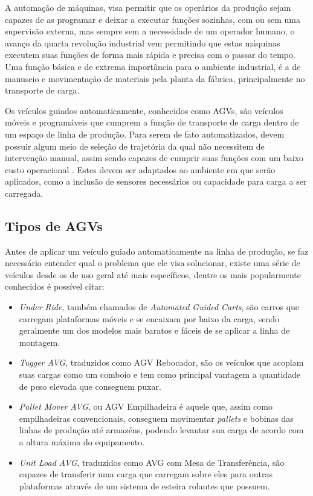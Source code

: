 A automação de máquinas, visa permitir que os operários da produção sejam
capazes de as programar e deixar a executar funções sozinhas, com ou sem uma
supervisão externa, mas sempre sem a necessidade de um operador humano, o
avanço da quarta revolução industrial vem permitindo que estas máquinas
executem suas funções de forma mais rápida e precisa com o passar do tempo. Uma
função básica e de extrema importância para o ambiente industrial, é a de
manuseio e movimentação de materiais pela planta da fábrica, principalmente no
transporte de carga. 


Os veículos guiados automaticamente, conhecidos como AGVs, são veículos móveis
e programáveis que cumprem a função de transporte de carga dentro de um espaço
de linha de produção. Para serem de fato automatizados, devem possuir algum
meio de seleção de trajetória da qual não necessitem de intervenção manual,
assim sendo capazes de cumprir suas funções com um baixo custo operacional
\cite{kumar2016}. Estes devem ser adaptados ao ambiente em que serão
aplicados, como a inclusão de sensores necessários ou capacidade para carga a
ser carregada.

\subsection{Tipos de AGVs}

Antes de aplicar um veículo guiado automaticamente na linha de produção, se faz
necessário entender qual o problema que ele visa solucionar, existe uma série
de veículos desde os de uso geral até mais específicos, dentre os mais
popularmente conhecidos é possível citar:

\begin{itemize}

        \item \textit{Under Ride}, também chamados de \textit{Automated Guided Carts}, são carros
                que carregam plataformas móveis e se encaixam por baixo da
                carga, sendo geralmente um dos modelos mais baratos e fáceis de
                se aplicar a linha de montagem.

        \item \textit{Tugger AVG}, traduzidos como AGV Rebocador, são os veículos que
                acoplam suas cargas como um comboio e tem como principal
                vantagem a quantidade de peso elevada que conseguem puxar.

        \item \textit{Pallet Mover AVG}, ou AGV Empilhadeira é aquele que, assim como
                empilhadeiras convencionais, conseguem movimentar \textit{pallets} e
                bobinas das linhas de produção até armazéns, podendo levantar
                sua carga de acordo com a altura máxima do equipamento.

        \item \textit{Unit Load AVG}, traduzidos como AVG com Mesa de Transferência, são
                capazes de transferir uma carga que carregam sobre eles para
                outras plataformas através de um sistema de esteira rolantes
                que possuem.

\end{itemize}

